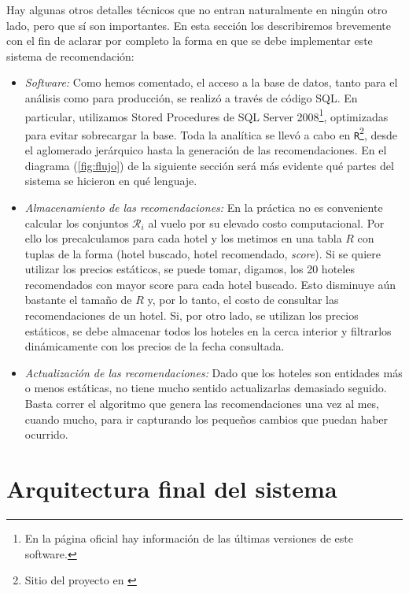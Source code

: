 \documentclass[12pt]{report}
\newcommand{\RR}{\mathcal{R}}
\begin{document}
Hay algunas otros detalles técnicos que no entran naturalmente en ningún otro lado, pero que sí son importantes. En esta sección los describiremos brevemente con el fin de aclarar por completo la forma en que se debe implementar este sistema de recomendación:
\begin{itemize}
	\item \emph{Software:} Como hemos comentado, el acceso a la base de datos, tanto para el análisis como para producción, se realizó a través de código SQL. En particular, utilizamos Stored Procedures de SQL Server 2008\footnote{En la página oficial \cite{sql} hay información de las últimas versiones de este software.}, optimizadas para evitar sobrecargar la base. Toda la analítica se llevó a cabo en \texttt{R}\footnote{Sitio del proyecto en \cite{R}}, desde el aglomerado jerárquico hasta la generación de las recomendaciones. En el diagrama (\ref{fig:flujo}) de la siguiente sección será más evidente qué partes del sistema se hicieron en qué lenguaje.
	\item \emph{Almacenamiento de las recomendaciones:} En la práctica no es conveniente calcular los conjuntos $\RR_i$ al vuelo por su elevado costo computacional. Por ello los precalculamos para cada hotel y los metimos en una tabla $R$ con tuplas de la forma (hotel buscado, hotel recomendado, \emph{score}). Si se quiere utilizar los precios estáticos, se puede tomar, digamos, los 20 hoteles recomendados con mayor score para cada hotel buscado. Esto disminuye aún bastante el tamaño de $R$ y, por lo tanto, el costo de consultar las recomendaciones de un hotel. Si, por otro lado, se utilizan los precios estáticos, se debe almacenar todos los hoteles en la cerca interior y filtrarlos dinámicamente con los precios de la fecha consultada.
	\item \emph{Actualización de las recomendaciones:} Dado que los hoteles son entidades más o menos estáticas, no tiene mucho sentido actualizarlas demasiado seguido. Basta correr el algoritmo que genera las recomendaciones una vez al mes, cuando mucho, para ir capturando los pequeños cambios que puedan haber ocurrido.
\end{itemize}


\section{Arquitectura final del sistema}
\end{document}

